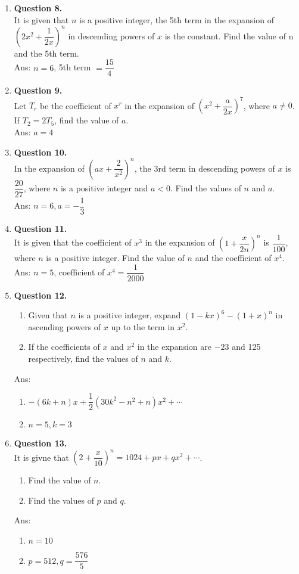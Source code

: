 \documentclass[12pt]{article}
\begin{document}
\begin{enumerate}
	\item {\bf Question 8.}\\
	It is given that $n$ is a positive integer, the 5th term in the expansion of $\left(2x^2+\dfrac{1}{2x}\right)^n$ in descending powers of $x$ is the constant. Find the value of n and the 5th term.\\
	Ans: $n = 6$, 5th term $= \dfrac{15}{4}$

	
	\item {\bf Question 9.}\\
	Let $T_r$ be the coefficient of $x^r$ in the expansion of $\left(x^2+\dfrac{a}{2x}\right)^7$, where $a\neq 0$. If $T_2 = 2T_5$, find the value of $a$. \\
	Ans: $a = 4$

	\item {\bf Question 10.}\\
	In the expansion of $\left(ax+\dfrac{2}{x^2}\right)^n$, the 3rd term in descending powers of $x$ is $\dfrac{20}{27}$, where $n$ is a positive integer and $a<0$. Find the values of $n$ and $a$. \\
	Ans: $n = 6, a = -\dfrac{1}{3}$


	\item {\bf Question 11.}\\
	It is given that the coefficient of $x^3$ in the expansion of $\left(1+\dfrac{x}{2n}\right)^n$ is $\dfrac{1}{100}$, where $n$ is a positive integer. Find the value of $n$ and the coefficient of $x^4$.\\
	Ans: $n = 5$, coefficient of $x^4 = \dfrac{1}{2000}$


	\item {\bf Question 12.}
	\begin{enumerate}
		\item Given that $n$ is a positive integer, expand $(1-kx)^6 - (1+x)^n$ in ascending powers of $x$ up to the term in $x^2$.
		\item If the coefficients of $x$ and $x^2$ in the expansion are $-23$ and 125 respectively, find the values of $n$ and $k$.
	\end{enumerate}
	Ans: 
	\begin{enumerate}
		\item $-(6k+n)x + \dfrac{1}{2}(30k^2 - n^2 +n)x^2+\cdots$
		\item $n = 5, k = 3$
	\end{enumerate}



	\item {\bf Question 13.}\\ 
	It is givne that $\left(2+\dfrac{x}{10}\right)^n = 1024 + px + qx^2 +\cdots$.
	\begin{enumerate}
		\item Find the value of $n$.
		\item Find the values of $p$ and $q$.
	\end{enumerate}
	Ans:
	\begin{enumerate}
		\item $n = 10$
		\item $p = 512, q = \dfrac{576}{5}$
	\end{enumerate}


\end{enumerate}
\end{document}
